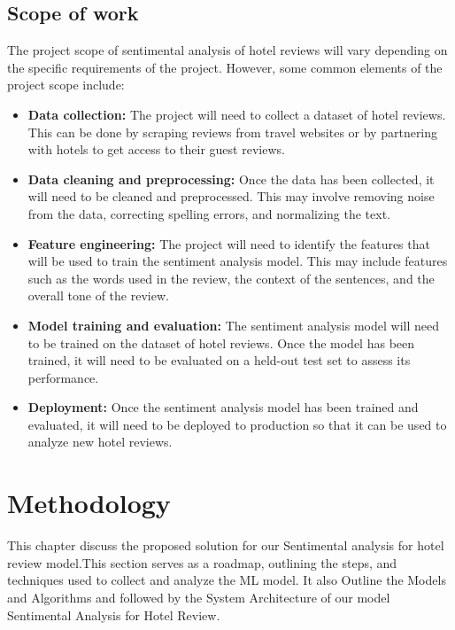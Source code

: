 \documentclass[a4paper, 12pt]{report}
\begin{document}
\section{Scope of work}
The project scope of sentimental analysis of hotel reviews will vary depending on the specific requirements of the project. However, some common elements of the project scope include:
\begin{itemize}
\item \textbf{Data collection:} The project will need to collect a dataset of hotel reviews. This can be done by scraping reviews from travel websites or by partnering with hotels to get access to their guest reviews.
\item \textbf{Data cleaning and preprocessing:} Once the data has been collected, it will need to be cleaned and preprocessed. This may involve removing noise from the data, correcting spelling errors, and normalizing the text.
\item \textbf{Feature engineering:} The project will need to identify the features that will be used to train the sentiment analysis model. This may include features such as the words used in the review, the context of the sentences, and the overall tone of the review.
\item \textbf{Model training and evaluation:} The sentiment analysis model will need to be trained on the dataset of hotel reviews. Once the model has been trained, it will need to be evaluated on a held-out test set to assess its performance.
\item \textbf{Deployment:} Once the sentiment analysis model has been trained and evaluated, it will need to be deployed to production so that it can be used to analyze new hotel reviews.
\end{itemize}

\chapter{Methodology}
This chapter discuss the proposed solution for our Sentimental analysis for hotel review model.This section serves as a roadmap, outlining the steps, and techniques used to collect and analyze the ML model. It also Outline the Models and Algorithms and followed by the System Architecture of our model Sentimental Analysis for Hotel Review.
\end{document}
